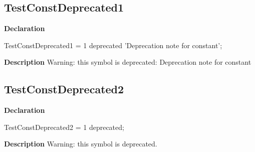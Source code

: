 \documentclass{report}
\newif\ifpdf
\begin{document}
\subsection*{TestConstDeprecated1}
\fi
\label{ok_deprecated_directive_note-TestConstDeprecated1}
\begin{list}{}{
\setlength{\itemindent}{0cm}
\setlength{\listparindent}{0cm}
\setlength{\leftmargin}{\evensidemargin}
\addtolength{\leftmargin}{\tmplength}
\settowidth{\labelsep}{X}
\addtolength{\leftmargin}{\labelsep}
\setlength{\labelwidth}{\tmplength}
}
\item[\textbf{Declaration}\hfill]
\ifpdf
\begin{flushleft}
\fi
\begin{ttfamily}
TestConstDeprecated1 = 1 deprecated 'Deprecation note for constant';\end{ttfamily}

\ifpdf
\end{flushleft}
\fi

\par
\item[\textbf{Description}]
Warning: this symbol is deprecated: Deprecation note for constant

 

\end{list}
\ifpdf
\subsection*{\large{\textbf{TestConstDeprecated2}}\normalsize\hspace{1ex}\hrulefill}
\else
\subsection*{TestConstDeprecated2}
\fi
\label{ok_deprecated_directive_note-TestConstDeprecated2}
\begin{list}{}{
\setlength{\itemindent}{0cm}
\setlength{\listparindent}{0cm}
\setlength{\leftmargin}{\evensidemargin}
\addtolength{\leftmargin}{\tmplength}
\settowidth{\labelsep}{X}
\addtolength{\leftmargin}{\labelsep}
\setlength{\labelwidth}{\tmplength}
}
\item[\textbf{Declaration}\hfill]
\ifpdf
\begin{flushleft}
\fi
\begin{ttfamily}
TestConstDeprecated2 = 1 deprecated;\end{ttfamily}

\ifpdf
\end{flushleft}
\fi

\par
\item[\textbf{Description}]
Warning: this symbol is deprecated.

 

\end{list}
\end{document}
